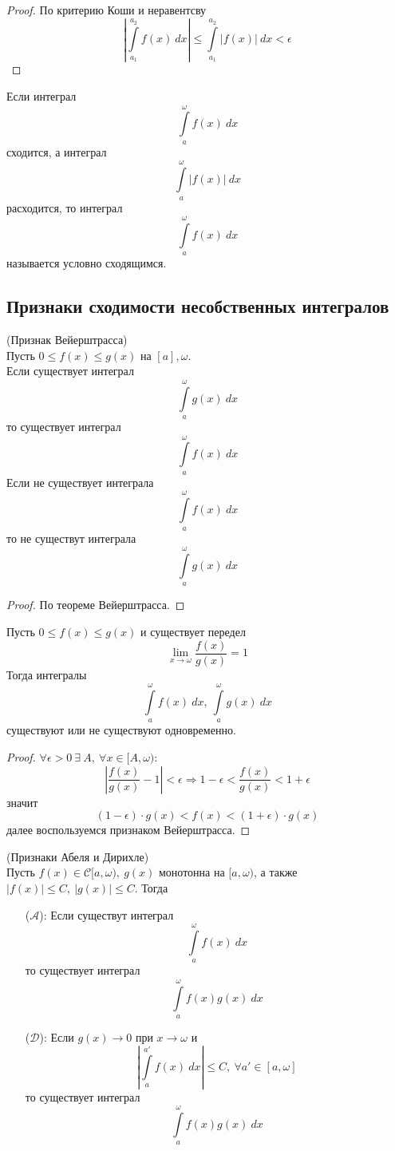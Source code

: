 \begin{proof}
    По критерию Коши и неравентсву
    \[\left|\int\limits_{a_1}^{a_2}f(x)\ dx\right|\leq \int\limits_{a_1}^{a_2}|f(x)|\ dx<\epsilon\]
\end{proof} 
\begin{definition}
    Если интеграл 
    \[\int\limits_{a}^{\omega}f(x)\ dx\]
    сходится, а интеграл 
    \[\int\limits_{a}^{\omega}|f(x)|\ dx\]
    расходится, то интеграл 
    \[\int\limits_{a}^{\omega}f(x)\ dx\]
    называется условно сходящимся.
\end{definition} 
\subsection{Признаки сходимости несобственных интегралов}
\begin{theorem}
    (Признак Вейерштрасса)\\
    Пусть $0\leq f(x)\leq g(x)$ на $[a],\omega$.\\
    Если существует интеграл
    \[\int\limits_{a}^{\omega}g(x)\ dx\]
    то существует интеграл
    \[\int\limits_{a}^{\omega}f(x)\ dx\]
    Если не существует интеграла
    \[\int\limits_{a}^{\omega}f(x)\ dx\]
    то не существут интеграла
    \[\int\limits_{a}^{\omega}g(x)\ dx\]
\end{theorem} 
\begin{proof}
    По теореме Вейерштрасса.
\end{proof}
\begin{theorem}
    Пусть $0\leq f(x)\leq g(x)$ и существует передел
    \[\lim\limits_{x\to \omega}\frac{f(x)}{g(x)}=1\]
    Тогда интегралы
    \[\int\limits_{a}^{\omega}f(x)\ dx,\ \int\limits_{a}^{\omega}g(x)\ dx\] 
    существуют или не существуют одновременно.
\end{theorem} 
\begin{proof}
    $\forall \epsilon>0\ \exists\ A,\ \forall x\in [A, \omega)$:
    \[|\frac{f(x)}{g(x)}-1|<\epsilon \Rightarrow 1-\epsilon<\frac{f(x)}{g(x)}<1+\epsilon\]
    значит
    \[(1-\epsilon)\cdot g(x)<f(x)<(1+\epsilon)\cdot g(x)\]
    далее воспользуемся признаком Вейерштрасса.
\end{proof} 
\begin{theorem}
    (Признаки Абеля и Дирихле)\\
    Пусть $f(x)\in \mathcal{C}[a,\omega),\ g(x)$ монотонна на $[a,\omega)$, а также $|f(x)|\leq C,\ |g(x)|\leq C$. Тогда 
    \begin{itemize}
        \item[($\mathcal{A}$):] Если существут интеграл 
        \[\int\limits_{a}^{\omega}f(x)\ dx\]
        то существует интеграл
        \[\int\limits_{a}^{\omega}f(x)g(x)\ dx\]
        \item[($\mathcal{D}$):] Если $g(x)\to 0$ при $x\to \omega$ и
        \[\left|\int\limits_{a}^{a'}f(x)\ dx\right|\leq C,\ \forall a'\in [a,\omega]\]
        то существует интеграл
        \[\int\limits_{a}^{\omega}f(x)g(x)\ dx\]
    \end{itemize}
\end{theorem} 
